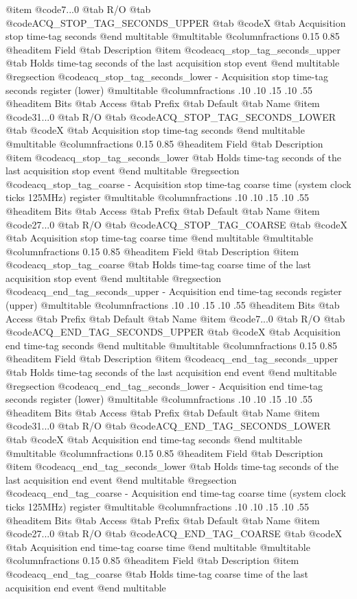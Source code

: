 @item @code{7...0}
@tab R/O @tab
@code{ACQ_STOP_TAG_SECONDS_UPPER}
@tab @code{X} @tab 
Acquisition stop time-tag seconds
@end multitable
@multitable @columnfractions 0.15 0.85
@headitem Field @tab Description
@item @code{acq_stop_tag_seconds_upper} @tab Holds time-tag seconds of the last acquisition stop event
@end multitable
@regsection @code{acq_stop_tag_seconds_lower} - Acquisition stop time-tag seconds register (lower)
@multitable @columnfractions .10 .10 .15 .10 .55
@headitem Bits @tab Access @tab Prefix @tab Default @tab Name
@item @code{31...0}
@tab R/O @tab
@code{ACQ_STOP_TAG_SECONDS_LOWER}
@tab @code{X} @tab 
Acquisition stop time-tag seconds
@end multitable
@multitable @columnfractions 0.15 0.85
@headitem Field @tab Description
@item @code{acq_stop_tag_seconds_lower} @tab Holds time-tag seconds of the last acquisition stop event
@end multitable
@regsection @code{acq_stop_tag_coarse} - Acquisition stop time-tag coarse time (system clock ticks 125MHz) register
@multitable @columnfractions .10 .10 .15 .10 .55
@headitem Bits @tab Access @tab Prefix @tab Default @tab Name
@item @code{27...0}
@tab R/O @tab
@code{ACQ_STOP_TAG_COARSE}
@tab @code{X} @tab 
Acquisition stop time-tag coarse time
@end multitable
@multitable @columnfractions 0.15 0.85
@headitem Field @tab Description
@item @code{acq_stop_tag_coarse} @tab Holds time-tag coarse time of the last acquisition stop event
@end multitable
@regsection @code{acq_end_tag_seconds_upper} - Acquisition end time-tag seconds register (upper)
@multitable @columnfractions .10 .10 .15 .10 .55
@headitem Bits @tab Access @tab Prefix @tab Default @tab Name
@item @code{7...0}
@tab R/O @tab
@code{ACQ_END_TAG_SECONDS_UPPER}
@tab @code{X} @tab 
Acquisition end time-tag seconds
@end multitable
@multitable @columnfractions 0.15 0.85
@headitem Field @tab Description
@item @code{acq_end_tag_seconds_upper} @tab Holds time-tag seconds of the last acquisition end event
@end multitable
@regsection @code{acq_end_tag_seconds_lower} - Acquisition end time-tag seconds register (lower)
@multitable @columnfractions .10 .10 .15 .10 .55
@headitem Bits @tab Access @tab Prefix @tab Default @tab Name
@item @code{31...0}
@tab R/O @tab
@code{ACQ_END_TAG_SECONDS_LOWER}
@tab @code{X} @tab 
Acquisition end time-tag seconds
@end multitable
@multitable @columnfractions 0.15 0.85
@headitem Field @tab Description
@item @code{acq_end_tag_seconds_lower} @tab Holds time-tag seconds of the last acquisition end event
@end multitable
@regsection @code{acq_end_tag_coarse} - Acquisition end time-tag coarse time (system clock ticks 125MHz) register
@multitable @columnfractions .10 .10 .15 .10 .55
@headitem Bits @tab Access @tab Prefix @tab Default @tab Name
@item @code{27...0}
@tab R/O @tab
@code{ACQ_END_TAG_COARSE}
@tab @code{X} @tab 
Acquisition end time-tag coarse time
@end multitable
@multitable @columnfractions 0.15 0.85
@headitem Field @tab Description
@item @code{acq_end_tag_coarse} @tab Holds time-tag coarse time of the last acquisition end event
@end multitable

